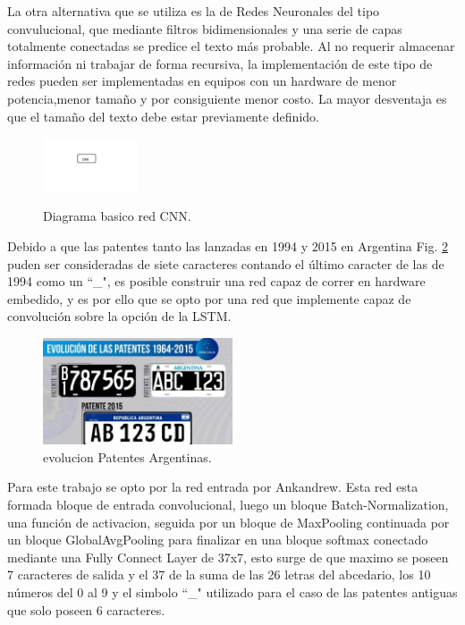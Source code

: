La otra alternativa que se utiliza es la de Redes Neuronales del tipo convulucional, que mediante filtros bidimensionales y una serie de capas totalmente conectadas se predice el texto más probable.
Al no requerir almacenar información ni trabajar de forma recursiva, la implementación
de este tipo de redes pueden ser implementadas en equipos con un hardware de menor potencia,menor tamaño y por consiguiente menor costo. La mayor desventaja es que el tamaño del texto debe estar previamente definido.
\begin{figure}[h]
    \centering
    \includegraphics[width=0.25\textwidth]{imgs/CNN-diagrama.jpg}
    \label{fig:diagrama-CNN}
    \caption{Diagrama basico red CNN.}
\end{figure}

Debido a que las patentes tanto las lanzadas en 1994 y 2015 en Argentina Fig. \ref{fig:patentes-arg} puden ser consideradas de siete caracteres contando el último caracter de las de 1994 como un ``\_", es posible construir una red capaz de correr en hardware embedido, y es por ello que se opto por una red que implemente capaz de convolución sobre la opción de la LSTM.

\begin{figure}[h]
    \centering
    \includegraphics[width=0.5\textwidth]{imgs/patentes-arg.png}
    \caption{evolucion Patentes Argentinas.}
    \label{fig:patentes-arg}
\end{figure}


Para este trabajo se opto por la red entrada por Ankandrew. Esta red esta formada bloque de entrada convolucional, luego un bloque Batch-Normalization, una función de activacion, seguida por un bloque de MaxPooling continuada por un bloque GlobalAvgPooling para finalizar en una bloque softmax conectado mediante una Fully Connect Layer de 37x7, esto surge de que maximo se poseen 7 caracteres de salida y el 37 de la suma de las 26 letras del abcedario, los 10 números del 0 al 9 y el simbolo ``\_" utilizado para el caso de las patentes antiguas
que solo poseen 6 caracteres.

